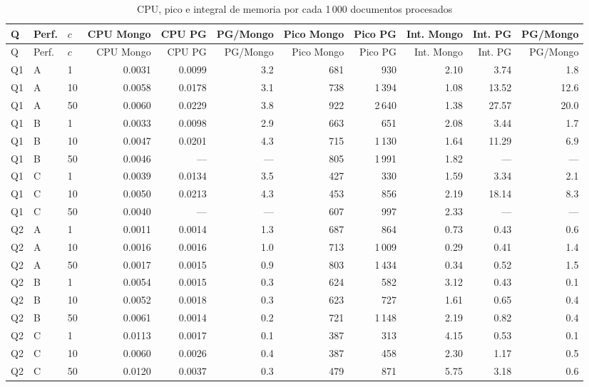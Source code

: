 \begin{longtable}{@{}lllrrrrrrrr@{}}
\caption{CPU, pico e integral de memoria por cada 1\,000 documentos procesados}\label{tab:m3}\\
\toprule
Q & Perf. & $c$ & CPU Mongo & CPU PG & PG/Mongo & Pico Mongo & Pico PG & Int. Mongo & Int. PG & PG/Mongo \\
\midrule\endfirsthead
\toprule
Q & Perf. & $c$ & CPU Mongo & CPU PG & PG/Mongo & Pico Mongo & Pico PG & Int. Mongo & Int. PG & PG/Mongo \\
\midrule\endhead
\bottomrule\endlastfoot
Q1 & A & 1 & 0.0031 & 0.0099 & 3.2 & 681 & 930 & 2.10 & 3.74 & 1.8 \\
Q1 & A & 10 & 0.0058 & 0.0178 & 3.1 & 738 & 1\,394 & 1.08 & 13.52 & 12.6 \\
Q1 & A & 50 & 0.0060 & 0.0229 & 3.8 & 922 & 2\,640 & 1.38 & 27.57 & 20.0 \\
Q1 & B & 1 & 0.0033 & 0.0098 & 2.9 & 663 & 651 & 2.08 & 3.44 & 1.7 \\
Q1 & B & 10 & 0.0047 & 0.0201 & 4.3 & 715 & 1\,130 & 1.64 & 11.29 & 6.9 \\
Q1 & B & 50 & 0.0046 & --- & --- & 805 & 1\,991 & 1.82 & --- & --- \\
Q1 & C & 1 & 0.0039 & 0.0134 & 3.5 & 427 & 330 & 1.59 & 3.34 & 2.1 \\
Q1 & C & 10 & 0.0050 & 0.0213 & 4.3 & 453 & 856 & 2.19 & 18.14 & 8.3 \\
Q1 & C & 50 & 0.0040 & --- & --- & 607 & 997 & 2.33 & --- & --- \\
\addlinespace[2pt]
Q2 & A & 1 & 0.0011 & 0.0014 & 1.3 & 687 & 864 & 0.73 & 0.43 & 0.6 \\
Q2 & A & 10 & 0.0016 & 0.0016 & 1.0 & 713 & 1\,009 & 0.29 & 0.41 & 1.4 \\
Q2 & A & 50 & 0.0017 & 0.0015 & 0.9 & 803 & 1\,434 & 0.34 & 0.52 & 1.5 \\
Q2 & B & 1 & 0.0054 & 0.0015 & 0.3 & 624 & 582 & 3.12 & 0.43 & 0.1 \\
Q2 & B & 10 & 0.0052 & 0.0018 & 0.3 & 623 & 727 & 1.61 & 0.65 & 0.4 \\
Q2 & B & 50 & 0.0061 & 0.0014 & 0.2 & 721 & 1\,148 & 2.19 & 0.82 & 0.4 \\
Q2 & C & 1 & 0.0113 & 0.0017 & 0.1 & 387 & 313 & 4.15 & 0.53 & 0.1 \\
Q2 & C & 10 & 0.0060 & 0.0026 & 0.4 & 387 & 458 & 2.30 & 1.17 & 0.5 \\
Q2 & C & 50 & 0.0120 & 0.0037 & 0.3 & 479 & 871 & 5.75 & 3.18 & 0.6 \\
\end{longtable}
